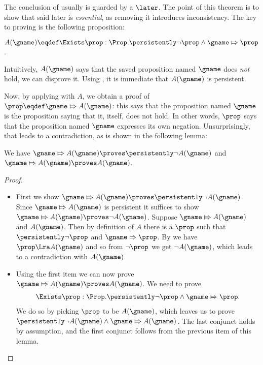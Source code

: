 The conclusion of  usually is guarded by a $\later$.
The point of this theorem is to show that said later is \emph{essential}, as removing it introduces inconsistency.
%
The key to proving  is the following proposition:
\begin{defn}
$A(\gname) \eqdef \Exists \prop : \Prop. \persistently\lnot \prop \land \gname \Mapsto \prop$.
\end{defn}
Intuitively, $A(\gname)$ says that the saved proposition named $\gname$ does \emph{not} hold, \ie we can disprove it.
Using , it is immediate that $A(\gname)$ is persistent.

Now, by applying  with $A$, we obtain a proof of $\prop \eqdef \gname \Mapsto A(\gname)$: this says that the proposition named $\gname$ is the proposition saying that it, itself, does not hold.
In other words, $\prop$ says that the proposition named $\gname$ expresses its own negation.
Unsurprisingly, that leads to a contradiction, as is shown in the following lemma:
\begin{lem}   \label{lem:saved-prop-counterexample-not-agname}   We have $\gname \Mapsto A(\gname) \proves \persistently\lnot A(\gname)$ and $\gname \Mapsto A(\gname) \proves A(\gname)$. \end{lem}
\begin{proof}%
\leavevmode
  \begin{itemize}
  \item First we show $\gname \Mapsto A(\gname) \proves \persistently\lnot A(\gname)$.
    Since $\gname \Mapsto A(\gname)$ is persistent it suffices to show $\gname \Mapsto A(\gname) \proves \lnot A(\gname)$.
    Suppose $\gname \Mapsto A(\gname)$ and $A(\gname)$.
    Then by definition of \(A\) there is a $\prop$ such that $\persistently \lnot \prop$ and $\gname \Mapsto \prop$.
    By  we have $\prop \Lra A(\gname)$ and so from $\lnot \prop$ we get $\lnot A(\gname)$, which leads to a contradiction with $A(\gname)$.
    
  \item Using the first item we can now prove $\gname \Mapsto A(\gname) \proves A(\gname)$.
    We need to prove
    \begin{align*}
      \Exists \prop : \Prop. \persistently \lnot \prop \land \gname \Mapsto \prop.
    \end{align*}
    We do so by picking $\prop$ to be $A(\gname)$, which leaves us to prove \(\persistently \lnot A(\gname) \land \gname \Mapsto A(\gname)\).
    The last conjunct holds by assumption, and the first conjunct follows from the previous item of this lemma.
  \end{itemize}
\end{proof}

